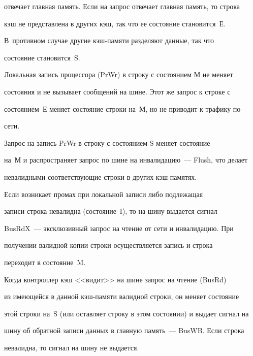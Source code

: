 отвечает главная память. Если на запрос отвечает главная память, то строка 


кэш не представлена в других кэш, так что ее состояние становится~Е. 


В~противном случае другие кэш-памяти разделяют данные, так что 


состояние становится~S.





Локальная запись процессора (PrWr) в строку с состоянием М не меняет 


состояния и не вызывает сообщений на шине. Этот же запрос к строке с 


состоянием~Е  меняет состояние строки на~М, но не приводит к трафику по 


сети. 








      Запрос на запись PrWr в строку с состоянием S меняет состояние 


на~М и распространяет запрос по шине на инвалидацию~--- Flush, что делает 


невалидными  соответствующие строки в других кэш-памятях.


      


      Если возникает промах при локальной записи либо подлежащая 


записи строка невалидна (состояние~I), то на шину выдается сигнал 


BusRdX~--- эксклюзивный запрос на чтение от сети и инвалидацию. При 


получении валидной копии строки осуществляется запись и строка 


переходит в состояние~M.


      


      Когда контроллер кэш <<видит>> на шине запрос на чтение (BusRd) 


из име\-ющей\-ся в данной кэш-памяти валидной строки, он меняет состояние 


этой строки на~S (или оставляет строку в этом состоянии) и выдает сигнал на 


шину об обратной записи данных в главную память~--- BusWB. Если строка 


невалидна, то сигнал на шину не выдается. 


      


